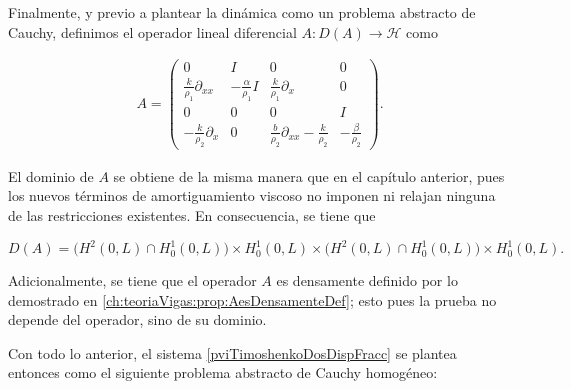 Finalmente, y previo a plantear la dinámica como un problema abstracto de Cauchy, definimos el operador lineal diferencial $A : D(A) \rightarrow \mathcal{H}$ como

\begin{align}
    \label{operadorATimoDosAmortig}
    A = 
    \begin{pmatrix}
        0 & I & 0 & 0\\
        \frac{k}{\rho_1}\partial_{xx} & -\frac{\alpha}{\rho_1}I & \frac{k}{\rho_1}\partial_x & 0\\
        0 & 0 & 0 & I\\
        -\frac{k}{\rho_2}\partial_x & 0 & \frac{b}{\rho_2}\partial_{xx} - \frac{k}{\rho_2} & -\frac{\beta}{\rho_2}
    \end{pmatrix}.
\end{align}

El dominio de $A$ se obtiene de la misma manera que en el capítulo anterior, pues los nuevos términos de amortiguamiento viscoso no imponen ni relajan ninguna de las restricciones existentes. En consecuencia, se tiene que

\[
    D(A) = \Big(H^2(0,L) \cap H_0^1(0,L) \Big) \times H_0^1(0,L) \times \Big(H^2(0,L) \cap H_0^1(0,L) \Big) \times H_0^1(0,L).
\]

Adicionalmente, se tiene que el operador $A$ es densamente definido por lo demostrado en \eqref{ch:teoriaVigas:prop:AesDensamenteDef}; esto pues la prueba no depende del operador, sino de su dominio. 

Con todo lo anterior, el sistema \eqref{pviTimoshenkoDosDispFracc} se plantea entonces como el siguiente problema abstracto de Cauchy homogéneo:

